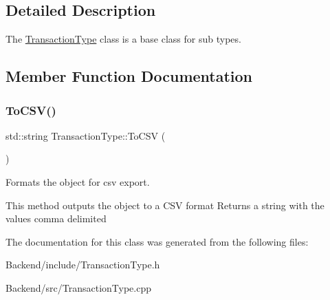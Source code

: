 \subsection{Detailed Description}
The \mbox{\hyperlink{class_transaction_type}{Transaction\+Type}} class is a base class for sub types. 

\subsection{Member Function Documentation}
\mbox{\label{class_transaction_type_ae93afca932014b0dfa4d1a3a66ca0ad2}} 
\subsubsection{\texorpdfstring{To\+C\+S\+V()}{ToCSV()}}
{\footnotesize\ttfamily std\+::string Transaction\+Type\+::\+To\+C\+SV (\begin{DoxyParamCaption}{ }\end{DoxyParamCaption})}



Formats the object for csv export. 

This method outputs the object to a C\+SV format Returns a string with the values comma delimited 

The documentation for this class was generated from the following files\+:\begin{DoxyCompactItemize}
\item 
Backend/include/Transaction\+Type.\+h\item 
Backend/src/Transaction\+Type.\+cpp\end{DoxyCompactItemize}
